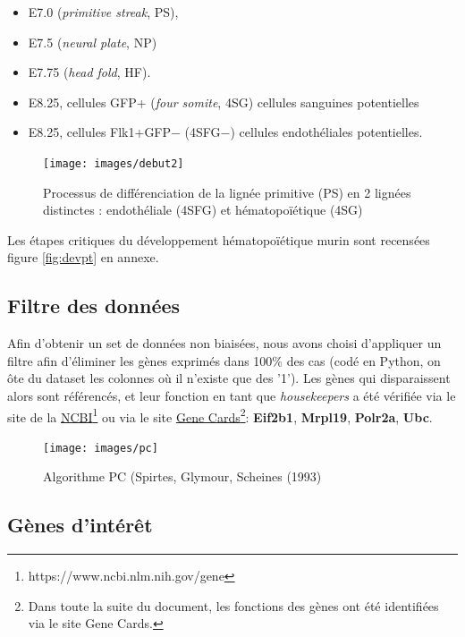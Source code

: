 \documentclass[fleqn,11pt]{SelfArx} %
\begin{document}
\begin{itemize}
\item E7.0 (\textit{primitive streak}, PS),
\item E7.5 (\textit{neural plate}, NP) 
\item E7.75 (\textit{head fold}, HF).
\item E8.25, cellules GFP+ (\textit{four somite}, 4SG) cellules sanguines potentielles
\item E8.25, cellules Flk1+GFP− (4SFG−) cellules endothéliales potentielles.
\end{itemize}



\begin{figure}[ht]
\centering
\texttt{[image: images/debut2]}
\caption{Processus de différenciation de la lignée primitive (PS) en 2 lignées distinctes : endothéliale (4SFG) et hématopoïétique (4SG)}
\label{fig:debut}
\end{figure}

Les étapes critiques du développement hématopoïétique murin sont recensées figure \ref{fig:devpt} en annexe.



\subsection{Filtre des données}
Afin d'obtenir un set de données non biaisées, nous avons choisi d'appliquer un filtre afin d'éliminer les gènes exprimés dans 100\% des cas (codé en Python, on ôte du dataset les colonnes où il n'existe que des '1'). Les gènes qui disparaissent alors sont référencés, et leur fonction en tant que \textit{housekeepers} a été vérifiée via le site de la \href{https://www.ncbi.nlm.nih.gov/gene}{NCBI}\footnote{https://www.ncbi.nlm.nih.gov/gene} ou via le site \href{http://www.genecards.org/}{Gene Cards}\footnote{Dans toute la suite du document, les fonctions des gènes ont été identifiées via le site Gene Cards.}: \textbf{Eif2b1}, \textbf{Mrpl19}, \textbf{Polr2a}, \textbf{Ubc}.


\begin{figure}[ht]
\centering
\texttt{[image: images/pc]}
\caption{Algorithme PC (Spirtes, Glymour, Scheines (1993)}
\label{fig:pc}
\end{figure}

\subsection{Gènes d'intérêt}
\end{document}

